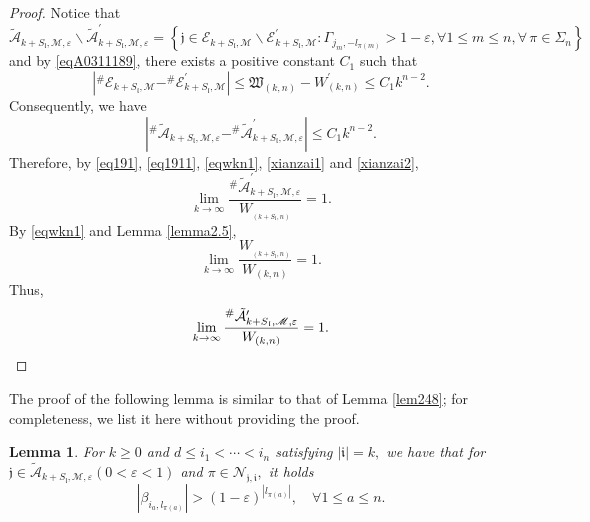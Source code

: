 \documentclass[11pt]{article}
\theoremstyle{plain}
\newtheorem{lem}[thm]{Lemma}
\theoremstyle{definition}
\begin{document}
{\begin{proof}
 Notice that $$\tilde{\mathcal{A}}_{k+S_\mathfrak{l},\mathscr{M},\varepsilon } \backslash \tilde{\mathcal{A}}_{k+S_\mathfrak{l},\mathscr{M},\varepsilon }^{\prime}=\left \{ \mathfrak{j}  \in \mathcal{E}_{k+S_\mathfrak{l},\mathscr{M} }\backslash \mathcal{E}_{k+S_\mathfrak{l},\mathscr{M} }^{\prime}:\Gamma_{j_{m},-l_{\pi  (m)}} > 1 - \varepsilon,  \forall 1 \leq m \leq n, \forall \, \pi \in \Sigma_{n}   \right \} $$
 and by \eqref{eqA0311189}, there exists a positive constant $C_1$ such that
 $$\left|^{\# } \mathcal{E}_{k+S_\mathfrak{l},\mathscr{M} }-^{\# } \mathcal{E}_{k+S_\mathfrak{l},\mathscr{M}}^{\prime}\right|\leq
 \mathfrak{W}_{(k,n)}-W^{\prime}_{(k,n)}\leq
 C_1k^{n-2}.$$
Consequently, we have
\begin{equation} \label{xianzai2}\left|^{\# } \tilde{\mathcal{A}}_{k+S_\mathfrak{l},\mathscr{M},\varepsilon }-^{\# } \tilde{\mathcal{A}}_{k+S_\mathfrak{l},\mathscr{M},\varepsilon }^{\prime}\right|\leq C_1k^{n-2}.\end{equation}
	Therefore, by \eqref{eq191}, \eqref{eq1911}, \eqref{eqwkn1}, \eqref{xianzai1} and \eqref{xianzai2},
	$$
\lim\limits_{k\to \infty}\frac{^{\#  }  \tilde{\mathcal{A} }_{k+S_{\mathfrak{l}},\mathscr{M},\varepsilon } ^{\prime} }{W_{_{(k+S_{\mathfrak{l}},n)}} }= 1.
$$
By \eqref{eqwkn1} and Lemma \ref{lemma2.5}, $$ 
\lim\limits_{k\to \infty}\frac {W_{_{(k+S_{\mathfrak{l}},n)}} }{W_{(k,n)} }= 1.
$$
	Thus,
		\begin{equation*}
			\lim\limits_{k\to \infty}\frac{^{\#  }  \tilde{\mathcal{A} }_{k+S_{\mathfrak{l}},\mathscr{M},\varepsilon }^{\prime}   }{W_{(k,n)} }= 1. \qedhere
		\end{equation*}
\end{proof}
The proof of the following lemma is similar to that of Lemma \ref{lem248}; for completeness, we list it here without providing the proof.
\begin{lem}\label{lemA248}
	For $k \geq 0$ and $d \leq i_1 < \cdots < i_n$ satisfying $|\mathfrak{i}|=k,$ we have that for $\mathfrak{j} \in \tilde{\mathcal{A}}_{k+S_{\mathfrak{l}},\mathscr{M},\varepsilon }(0 < \varepsilon < 1)$ 
	and $\pi \in \mathcal{N}_{\mathfrak{j}, \mathfrak{i}  },$
	it holds
	\begin{equation*}\label{eq25111} \left | \beta_{i_{a},l_{\pi  (a)}} \right | >\left ( 1 - \varepsilon \right ) ^{ \left | l_{\pi(a)} \right |   },\quad \forall 1 \le a \le n.\end{equation*}

\end{lem}}
\end{document}
